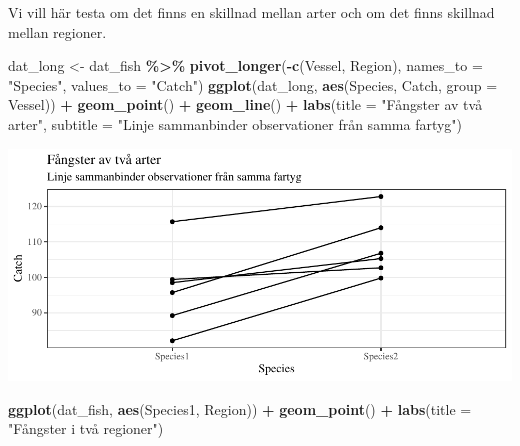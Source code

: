 \documentclass[
]{book}
\newenvironment{Shaded}{\begin{snugshade}}{\end{snugshade}}
\newcommand{\AttributeTok}[1]{\textcolor[rgb]{0.13,0.29,0.53}{#1}}
\newcommand{\FunctionTok}[1]{\textcolor[rgb]{0.13,0.29,0.53}{\textbf{#1}}}
\newcommand{\NormalTok}[1]{#1}
\newcommand{\OtherTok}[1]{\textcolor[rgb]{0.56,0.35,0.01}{#1}}
\newcommand{\SpecialCharTok}[1]{\textcolor[rgb]{0.81,0.36,0.00}{\textbf{#1}}}
\newcommand{\StringTok}[1]{\textcolor[rgb]{0.31,0.60,0.02}{#1}}
\theoremstyle{definition}
\theoremstyle{definition}
\theoremstyle{definition}
\theoremstyle{definition}
\theoremstyle{remark}
\begin{document}
Vi vill här testa om det finns en skillnad mellan arter och om det finns skillnad mellan regioner.

\begin{Shaded}
\begin{Highlighting}[]
\NormalTok{dat\_long }\OtherTok{\textless{}{-}}\NormalTok{ dat\_fish }\SpecialCharTok{\%\textgreater{}\%} 
  \FunctionTok{pivot\_longer}\NormalTok{(}\SpecialCharTok{{-}}\FunctionTok{c}\NormalTok{(Vessel, Region), }\AttributeTok{names\_to =} \StringTok{"Species"}\NormalTok{, }\AttributeTok{values\_to =} \StringTok{"Catch"}\NormalTok{)}
\FunctionTok{ggplot}\NormalTok{(dat\_long, }\FunctionTok{aes}\NormalTok{(Species, Catch, }\AttributeTok{group =}\NormalTok{ Vessel)) }\SpecialCharTok{+} 
  \FunctionTok{geom\_point}\NormalTok{() }\SpecialCharTok{+} 
  \FunctionTok{geom\_line}\NormalTok{() }\SpecialCharTok{+}
  \FunctionTok{labs}\NormalTok{(}\AttributeTok{title =} \StringTok{"Fångster av två arter"}\NormalTok{, }\AttributeTok{subtitle =} \StringTok{"Linje sammanbinder observationer från samma fartyg"}\NormalTok{)}
\end{Highlighting}
\end{Shaded}

\begin{center}\includegraphics{R-anvisningar_files/figure-latex/unnamed-chunk-202-1} \end{center}

\begin{Shaded}
\begin{Highlighting}[]
\FunctionTok{ggplot}\NormalTok{(dat\_fish, }\FunctionTok{aes}\NormalTok{(Species1, Region)) }\SpecialCharTok{+} 
  \FunctionTok{geom\_point}\NormalTok{() }\SpecialCharTok{+}
  \FunctionTok{labs}\NormalTok{(}\AttributeTok{title =} \StringTok{"Fångster i två regioner"}\NormalTok{)}
\end{Highlighting}
\end{Shaded}
\end{document}
